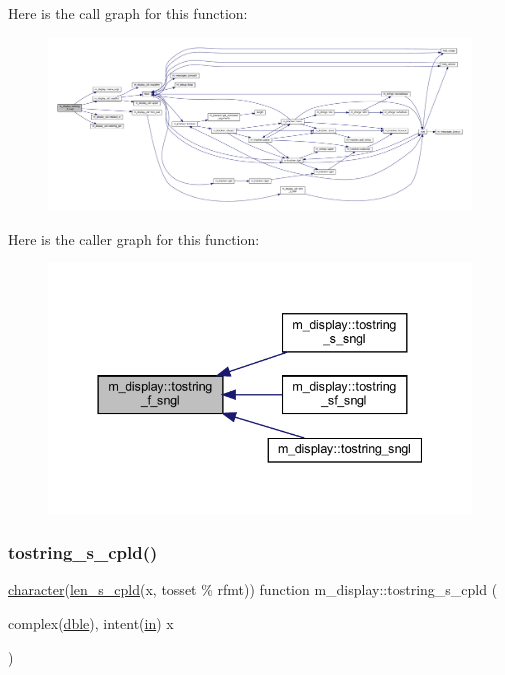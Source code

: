 Here is the call graph for this function\+:
\nopagebreak
\begin{figure}[H]
\begin{center}
\leavevmode
\includegraphics[width=350pt]{namespacem__display_a3c751ef3422139ca7190d5b0d64638a8_cgraph}
\end{center}
\end{figure}
Here is the caller graph for this function\+:
\nopagebreak
\begin{figure}[H]
\begin{center}
\leavevmode
\includegraphics[width=337pt]{namespacem__display_a3c751ef3422139ca7190d5b0d64638a8_icgraph}
\end{center}
\end{figure}
\mbox{\label{namespacem__display_ac2a60653468bfb9215fb85b4518363e9}} 
\subsubsection{\texorpdfstring{tostring\+\_\+s\+\_\+cpld()}{tostring\_s\_cpld()}}
{\footnotesize\ttfamily \hyperlink{option__stopwatch_83_8txt_abd4b21fbbd175834027b5224bfe97e66}{character}(\hyperlink{namespacem__display_ace35690c2f36e28f07336cc7dcff47f4}{len\+\_\+s\+\_\+cpld}(x, tosset \% rfmt)) function m\+\_\+display\+::tostring\+\_\+s\+\_\+cpld (\begin{DoxyParamCaption}\item[{complex(\hyperlink{namespacem__display_a46d90b75b6ccef7ccade133e5847e815}{dble}), intent(\hyperlink{M__journal_83_8txt_afce72651d1eed785a2132bee863b2f38}{in})}]{x }\end{DoxyParamCaption})\hspace{0.3cm}{\ttfamily [private]}}



